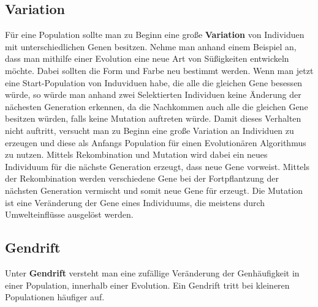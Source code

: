 \subsection{Variation}

F{\"u}r eine Population sollte man zu Beginn eine gro{\ss}e \textbf{Variation} von Individuen mit unterschiedlichen Genen besitzen. 
Nehme man anhand einem Beispiel an, dass man mithilfe einer Evolution eine neue Art von S{\"u}{\ss}igkeiten entwickeln m{\"o}chte. Dabei sollten die Form und Farbe neu bestimmt werden. Wenn man jetzt eine Start-Population von Induviduen habe, die alle die gleichen Gene besessen w{\"u}rde, so w{\"u}rde man anhand zwei Selektierten Individuen keine {\"A}nderung der n{\"a}chesten Generation erkennen, da die Nachkommen auch alle die gleichen Gene besitzen w{\"u}rden, falls keine Mutation auftreten w{\"u}rde.
Damit dieses Verhalten nicht auftritt, versucht man zu Beginn eine gro{\ss}e Variation an Individuen zu erzeugen und diese als Anfangs Population f{\"u}r einen Evolution{\"a}ren Algorithmus zu nutzen. Mittels Rekombination und Mutation wird dabei ein neues Individuum f{\"u}r die n{\"a}chste Generation erzeugt, dass neue Gene vorweist. Mittels der Rekombination werden verschiedene Gene bei der Fortpflantzung der n{\"a}chsten Generation vermischt und somit neue Gene f{\"u}r erzeugt. Die Mutation ist eine Ver{\"a}nderung der Gene eines Individuums, die meistens durch Umwelteinfl{\"u}sse ausgel{\"o}st werden. \cite{flickevolutionare} 



\subsection{Gendrift}
Unter \textbf{Gendrift} versteht man eine zuf{\"a}llige Ver{\"a}nderung der Genh{\"a}ufigkeit in einer Population, innerhalb einer Evolution. Ein Gendrift tritt bei kleineren Populationen h{\"a}ufiger auf. \cite{brockhausonline} %


